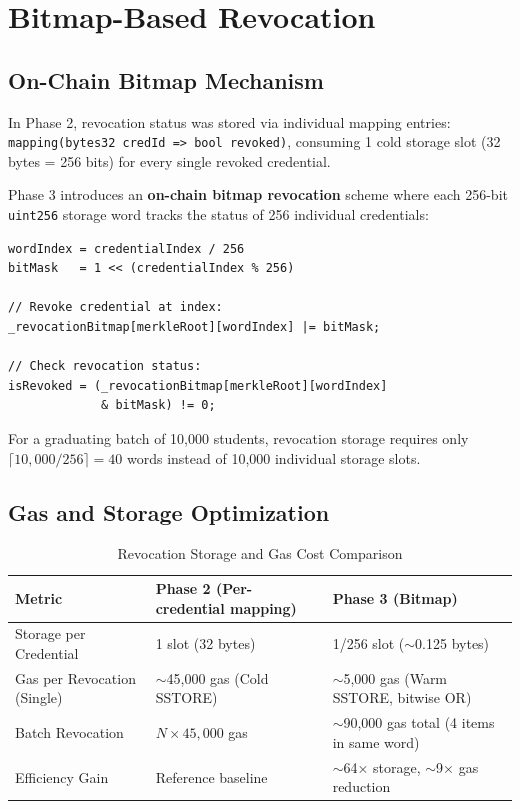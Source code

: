 \section{Bitmap-Based Revocation}

\subsection{On-Chain Bitmap Mechanism}

In Phase 2, revocation status was stored via individual mapping entries: \texttt{mapping(bytes32 credId => bool revoked)}, consuming 1 cold storage slot (32 bytes = 256 bits) for every single revoked credential.

Phase 3 introduces an \textbf{on-chain bitmap revocation} scheme where each 256-bit \texttt{uint256} storage word tracks the status of 256 individual credentials:

\begin{lstlisting}
wordIndex = credentialIndex / 256
bitMask   = 1 << (credentialIndex % 256)

// Revoke credential at index:
_revocationBitmap[merkleRoot][wordIndex] |= bitMask;

// Check revocation status:
isRevoked = (_revocationBitmap[merkleRoot][wordIndex] 
             & bitMask) != 0;
\end{lstlisting}

For a graduating batch of 10,000 students, revocation storage requires only $\lceil 10,000 / 256 \rceil = 40$ words instead of 10,000 individual storage slots.

\subsection{Gas and Storage Optimization}

\begin{table}[H]
\centering
\renewcommand{\arraystretch}{1.3}
\begin{tabular}{|p{4.2cm}|p{5.2cm}|p{5.2cm}|}
\hline
\textbf{Metric} & \textbf{Phase 2 (Per-credential mapping)} & \textbf{Phase 3 (Bitmap)} \\
\hline
Storage per Credential & 1 slot (32 bytes) & 1/256 slot ($\sim$0.125 bytes) \\
\hline
Gas per Revocation (Single) & $\sim$45,000 gas (Cold SSTORE) & $\sim$5,000 gas (Warm SSTORE, bitwise OR) \\
\hline
Batch Revocation & $N \times 45,000$ gas & $\sim$90,000 gas total (4 items in same word) \\
\hline
Efficiency Gain & Reference baseline & $\sim$64$\times$ storage, $\sim$9$\times$ gas reduction \\
\hline
\end{tabular}
\caption{Revocation Storage and Gas Cost Comparison}
\label{tab:revocation-comparison}
\end{table}

